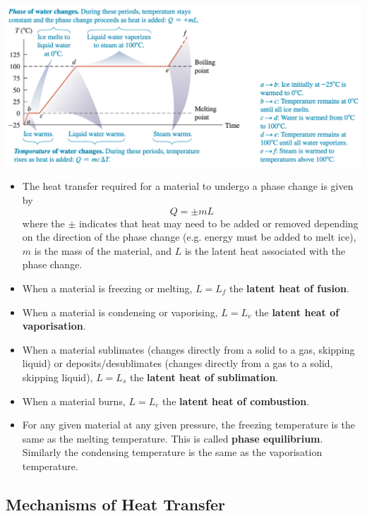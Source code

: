 \documentclass{article}
\begin{document}
\includegraphics[scale=0.43]{phase-vs-temperature}

\begin{itemize}
  \item The heat transfer required for a material to undergo a phase change is given by \[Q = \pm m L\] where the $\pm$ indicates that heat may need to be added or removed depending on the direction of the phase change (e.g. energy must be added to melt ice), $m$ is the mass of the material, and $L$ is the latent heat associated with the phase change.

  \item When a material is freezing or melting, $L = L_f$ the \textbf{latent heat of fusion}.

  \item When a material is condensing or vaporising, $L = L_v$ the \textbf{latent heat of vaporisation}.

  \item When a material sublimates (changes directly from a solid to a gas, skipping liquid) or deposits/desublimates (changes directly from a gas to a solid, skipping liquid), $L = L_s$ the \textbf{latent heat of sublimation}.

  \item When a material burns, $L = L_c$ the \textbf{latent heat of combustion}.

  \item For any given material at any given pressure, the freezing temperature is the same as the melting temperature. This is called \textbf{phase equilibrium}. Similarly the condensing temperature is the same as the vaporisation temperature.
\end{itemize}

\subsection{Mechanisms of Heat Transfer}
\end{document}
